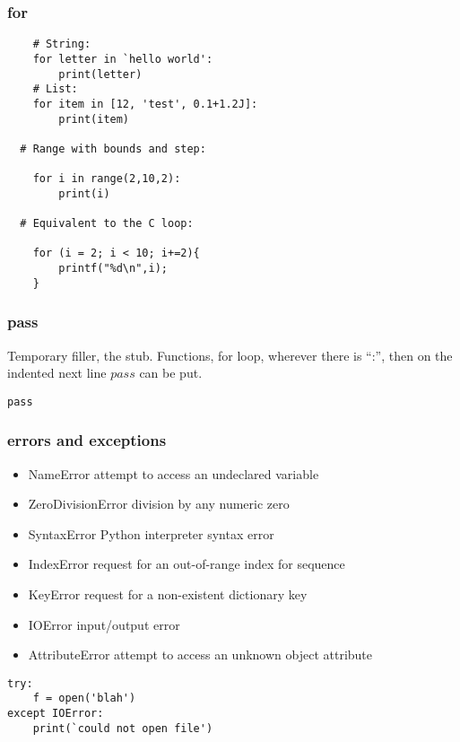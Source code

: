 \begin{frame}[fragile]\frametitle{for}
  \begin{lstlisting}
	# String:
	for letter in `hello world':
		print(letter)
	# List:
	for item in [12, 'test', 0.1+1.2J]:
		print(item)

  # Range with bounds and step:		

	for i in range(2,10,2):
		print(i)

  # Equivalent to the C loop:

	for (i = 2; i < 10; i+=2){
		printf("%d\n",i);
	}
  \end{lstlisting}
\end{frame}

\begin{frame}[fragile]\frametitle{pass}
Temporary filler, the stub.   Functions, for loop, wherever there is ``:'', then on the indented next line $pass$ can be put.

  \begin{lstlisting}
pass
  \end{lstlisting}
\end{frame}

\begin{frame}[fragile]\frametitle{errors and exceptions}

  \begin{itemize}
  \item NameError attempt to access an undeclared variable
  \item ZeroDivisionError division by any numeric zero
  \item SyntaxError Python interpreter syntax error
  \item IndexError request for an out-of-range index for sequence
  \item KeyError request for a non-existent dictionary key
  \item IOError input/output error
  \item AttributeError attempt to access an unknown object attribute
  \end{itemize}
	
  \begin{lstlisting}
try:
	f = open('blah')
except IOError:
	print(`could not open file')
  \end{lstlisting}	
\end{frame}


